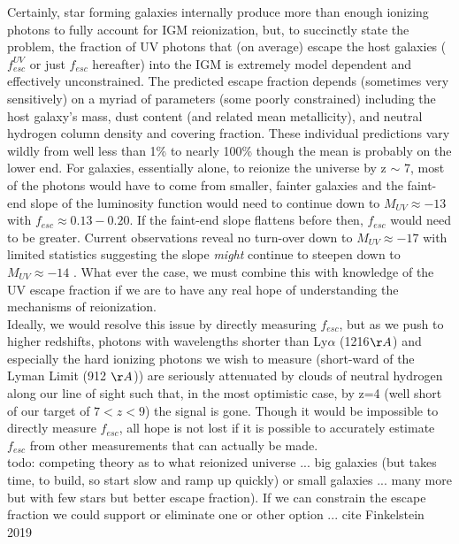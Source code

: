 \documentclass{aastex62}
\begin{document}
Certainly, star forming galaxies internally produce more than enough ionizing photons to fully account for IGM reionization, but, to succinctly state the problem, the fraction of UV photons that (on average) escape the host galaxies ($f^{UV}_{esc}$ or just $f_{esc}$ hereafter) into the IGM is extremely model dependent and effectively unconstrained. The predicted escape fraction depends (sometimes very sensitively) on a myriad of parameters (some poorly constrained) including the host galaxy's mass, dust content (and related mean metallicity), and neutral hydrogen column density and covering fraction. These individual predictions vary wildly from well less than 1\% to nearly 100\% \cite{Zackrisson} though the mean is probably on the lower end. For galaxies, essentially alone, to reionize the universe by z $\sim$ 7, most of the photons would have to come from smaller, fainter galaxies and the faint-end slope of the luminosity function would need to continue down to $M_{UV} \approx -13$ with $f_{esc} \approx 0.13 - 0.20$. If the faint-end slope flattens before then, $f_{esc}$ would need to be greater. Current observations reveal no turn-over down to $M_{UV} \approx -17$ with limited statistics suggesting the slope \textit{might} continue to steepen down to $M_{UV} \approx -14$ \cite{Livermore}. What ever the case, we must combine this with knowledge of the UV escape fraction if we are to have any real hope of understanding the mechanisms of reionization.\\

Ideally, we would resolve this issue by directly measuring $f_{esc}$, but as we push to higher redshifts, photons with wavelengths shorter than Ly$\alpha$ (1216$\AA$) and especially the hard ionizing photons we wish to measure (short-ward of the Lyman Limit (912 $\AA$)) are seriously attenuated by clouds of neutral hydrogen along our line of sight such that, in the most optimistic case, by z=4 (well short of our target of $7 < z < 9$) the signal is gone. Though it would be impossible to directly measure $f_{esc}$, all hope is not lost if it is possible to accurately estimate $f_{esc}$ from other measurements that can actually be made.\\

{ \color{red} todo: competing theory as to what reionized universe ... big galaxies (but takes time, to build, so start slow and ramp up quickly) or small galaxies ... many more but with few stars but better escape fraction). If we can constrain the escape fraction we could support or eliminate one or other option ... cite Finkelstein 2019}\\
\end{document}
